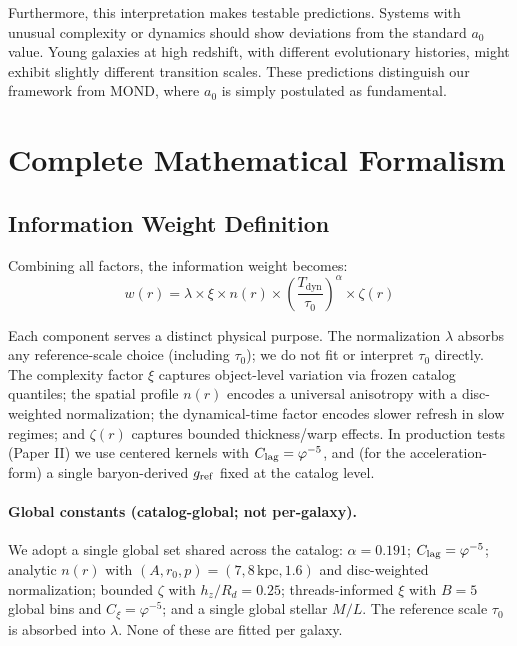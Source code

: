 \documentclass[usenatbib]{mnras}
\begin{document}
Furthermore, this interpretation makes testable predictions. Systems with unusual complexity or dynamics should show deviations from the standard $a_0$ value. Young galaxies at high redshift, with different evolutionary histories, might exhibit slightly different transition scales. These predictions distinguish our framework from MOND, where $a_0$ is simply postulated as fundamental.

\section{Complete Mathematical Formalism}
\label{sec:formalism}

\subsection{Information Weight Definition}

Combining all factors, the information weight becomes:
\begin{equation}
w(r) = \lambda \times \xi \times n(r) \times \left(\frac{T_{\text{dyn}}}{\tau_0}\right)^\alpha \times \zeta(r)
\end{equation}

Each component serves a distinct physical purpose. The normalization $\lambda$ absorbs any reference-scale choice (including $\tau_0$); we do not fit or interpret $\tau_0$ directly. The complexity factor $\xi$ captures object-level variation via frozen catalog quantiles; the spatial profile $n(r)$ encodes a universal anisotropy with a disc-weighted normalization; the dynamical-time factor encodes slower refresh in slow regimes; and $\zeta(r)$ captures bounded thickness/warp effects. In production tests (Paper II) we use centered kernels with $C_{\rm lag}=\varphi^{-5}$, and (for the acceleration-form) a single baryon-derived $g_{\rm ref}$ fixed at the catalog level.

\paragraph{Global constants (catalog-global; not per-galaxy).} We adopt a single global set shared across the catalog: $\alpha=0.191$; $C_{\rm lag}=\varphi^{-5}$; analytic $n(r)$ with $(A,r_0,p)=(7,8\,\mathrm{kpc},1.6)$ and disc-weighted normalization; bounded $\zeta$ with $h_z/R_d=0.25$; threads-informed $\xi$ with $B=5$ global bins and $C_\xi=\varphi^{-5}$; and a single global stellar $M/L$. The reference scale $\tau_0$ is absorbed into $\lambda$. None of these are fitted per galaxy.
\end{document}
